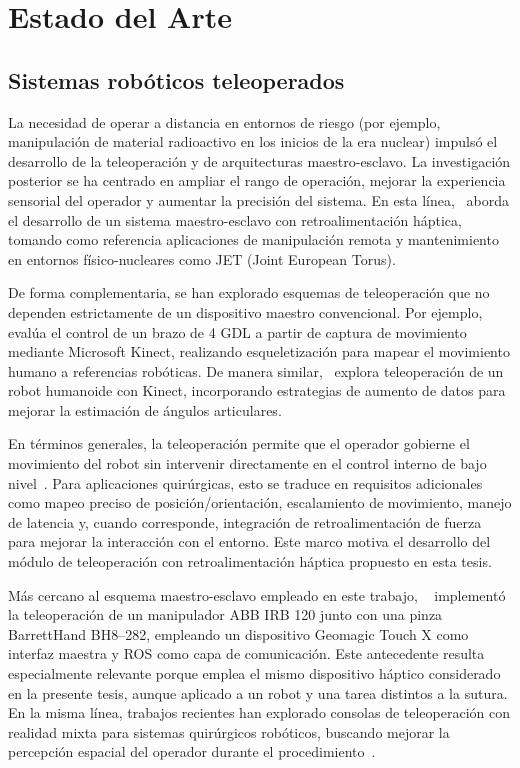\section{Estado del Arte}

\subsection{Sistemas robóticos teleoperados}

La necesidad de operar a distancia en entornos de riesgo (por ejemplo,
manipulación de material radioactivo en los inicios de la era nuclear) impulsó
el desarrollo de la teleoperación y de arquitecturas maestro-esclavo. La
investigación posterior se ha centrado en ampliar el rango de operación,
mejorar la experiencia sensorial del operador y aumentar la precisión del
sistema. En esta línea,~\cite{martinez2016desarrollo} aborda el desarrollo de
un sistema maestro-esclavo con retroalimentación háptica, tomando como
referencia aplicaciones de manipulación remota y mantenimiento en entornos
físico-nucleares como JET (Joint European Torus).

De forma complementaria, se han explorado esquemas de teleoperación que no
dependen estrictamente de un dispositivo maestro convencional. Por ejemplo,
~\cite{syakir_teleoperation_2019} evalúa el control de un brazo de 4 GDL a
partir de captura de movimiento mediante Microsoft Kinect, realizando
esqueletización para mapear el movimiento humano a referencias robóticas. De
manera similar,~\cite{NAO-robot} explora teleoperación de un robot humanoide
con Kinect, incorporando estrategias de aumento de datos para mejorar la
estimación de ángulos articulares.

En términos generales, la teleoperación permite que el operador gobierne el
movimiento del robot sin intervenir directamente en el control interno de bajo
nivel~\cite{you_assisted_2012}. Para aplicaciones quirúrgicas, esto se traduce
en requisitos adicionales como mapeo preciso de posición/orientación,
escalamiento de movimiento, manejo de latencia y, cuando corresponde,
integración de retroalimentación de fuerza para mejorar la interacción con el
entorno. Este marco motiva el desarrollo del módulo de teleoperación con
retroalimentación háptica propuesto en esta tesis.

Más cercano al esquema maestro-esclavo empleado en este trabajo,
~\cite{teleoperation_irb120_geomagic} implementó la teleoperación de un
manipulador ABB IRB 120 junto con una pinza BarrettHand BH8--282, empleando un
dispositivo Geomagic Touch X como interfaz maestra y ROS como capa de
comunicación. Este antecedente resulta especialmente relevante porque emplea el
mismo dispositivo háptico considerado en la presente tesis, aunque aplicado a
un robot y una tarea distintos a la sutura. En la misma línea, trabajos
recientes han explorado consolas de teleoperación con realidad mixta para
sistemas quirúrgicos robóticos, buscando mejorar la percepción espacial del
operador durante el procedimiento~\cite{rodriguez2025consola}.

